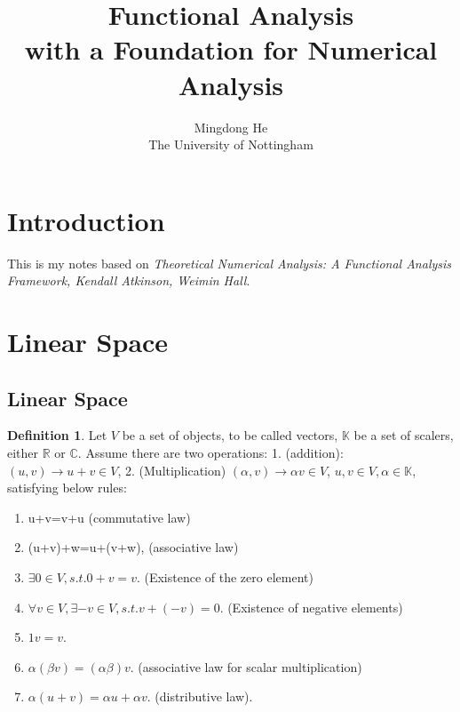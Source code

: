 \documentclass{article}
\theoremstyle{definition}
\newtheorem{definition}{Definition}[section]
\begin{document}

\title{Functional Analysis \\ with a Foundation for Numerical Analysis} %
\author{Mingdong He\\The University of Nottingham} 

\maketitle

\tableofcontents
%
\section{Introduction}
This is my notes based on \textit{Theoretical Numerical Analysis: A Functional Analysis Framework, Kendall Atkinson, Weimin Hall}. 
\section{Linear Space}
\subsection{Linear Space}
\begin{definition}
Let $V$ be a set of objects, to be called vectors, $\mathbb{K}$ be a set of scalers, either $\mathbb{R}$ or $\mathbb{C}$. Assume there are two operations: 1. (addition): $(u,v) \to u+v \in V$, 2. (Multiplication) $(\alpha,v) \to \alpha v \in V$, $u,v \in V, \alpha \in \mathbb{K}$, satisfying below rules:
\begin{enumerate}
	\item u+v=v+u (commutative law)
	\item (u+v)+w=u+(v+w), (associative law)
	\item $\exists 0 \in V, s.t. 0+v=v$. (Existence of the zero element)
	\item $\forall v \in V, \exists -v \in V, s.t. v+(-v)=0$. (Existence of negative elements)
	\item $1v=v$.
	\item $\alpha(\beta v)=(\alpha \beta)v$. (associative law for scalar multiplication)
	\item $\alpha(u+v)=\alpha u+\alpha v$. (distributive law).
\end{enumerate}	
\end{definition}
\end{document}
